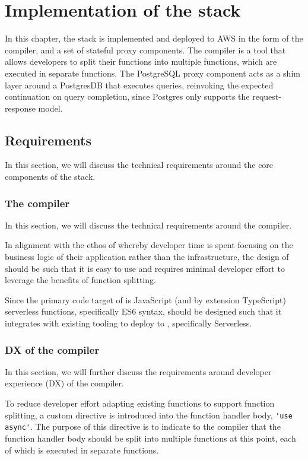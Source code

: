 \chapter{Implementation of the \faaas{} stack}
In this chapter, the \faaas{} stack is implemented and deployed to AWS in the form of the \faaasc{} compiler, and a set of stateful proxy components. The \faaasc{} compiler is a tool that allows developers to split their functions into multiple functions, which are executed in separate \awslambda{} functions. The PostgreSQL proxy component acts as a shim layer around a PostgresDB that executes queries, reinvoking the expected continuation on query completion, since Postgres only supports the request-response model.

\section{Requirements}
In this section, we will discuss the technical requirements around the core components of the \faaas{} stack.

\cprotect\subsection{The \faaasc{} compiler}
In this section, we will discuss the technical requirements around the \faaasc{} compiler.

In alignment with the ethos of \faas{} whereby developer time is spent focusing on the business logic of their application rather than the infrastructure, the design of \faaasc{} should be such that it is easy to use and requires minimal developer effort to leverage the benefits of function splitting.

Since the primary code target of \faaasc{} is JavaScript (and by extension TypeScript) serverless functions, specifically ES6 syntax, \faaasc{} should be designed such that it integrates with existing tooling to deploy to \awslambda{}, specifically Serverless\cite{serverlessServerlessZeroFrictionServerless2024}.

\cprotect\subsection{DX of the \faaasc{} compiler}
In this section, we will further discuss the requirements around developer experience (DX) of the \faaasc{} compiler.

To reduce developer effort adapting existing functions to support function splitting, a custom directive is introduced into the function handler body, \verb|'use async'|. The purpose of this directive is to indicate to the \faaasc{} compiler that the function handler body should be split into multiple functions at this point, each of which is executed in separate \awslambda{} functions.

